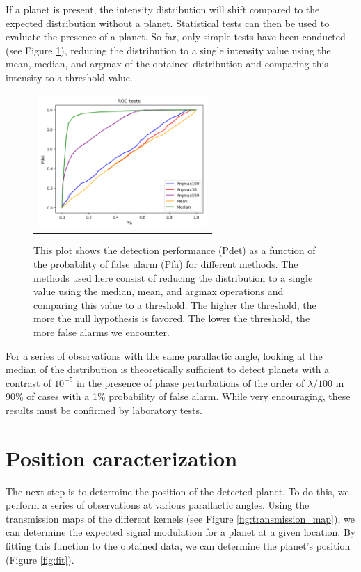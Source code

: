 \documentclass[]{spie}  %
\begin{document}
If a planet is present, the intensity distribution will shift compared to the expected distribution without a planet. Statistical tests can then be used to evaluate the presence of a planet. So far, only simple tests have been conducted (see Figure \ref{fig:ROC}), reducing the distribution to a single intensity value using the mean, median, and argmax of the obtained distribution and comparing this intensity to a threshold value.

\begin{figure} [H]
    \begin{center}
    \begin{tabular}{c}
    \includegraphics[height=5cm]{img/ROC.png}
    \end{tabular}
    \end{center}
    \caption[ROC] 
    { \label{fig:ROC} 
    This plot shows the detection performance (Pdet) as a function of the probability of false alarm (Pfa) for different methods. The methods used here consist of reducing the distribution to a single value using the median, mean, and argmax operations and comparing this value to a threshold. The higher the threshold, the more the null hypothesis is favored. The lower the threshold, the more false alarms we encounter.}
\end{figure}

For a series of observations with the same parallactic angle, looking at the median of the distribution is theoretically sufficient to detect planets with a contrast of $10^{-5}$ in the presence of phase perturbations of the order of $\lambda / 100$ in 90\% of cases with a 1\% probability of false alarm. While very encouraging, these results must be confirmed by laboratory tests.

\section{Position caracterization}

The next step is to determine the position of the detected planet. To do this, we perform a series of observations at various parallactic angles. Using the transmission maps of the different kernels (see Figure \ref{fig:transmission_map}), we can determine the expected signal modulation for a planet at a given location. By fitting this function to the obtained data, we can determine the planet's position (Figure \ref{fig:fit}).
\end{document}
